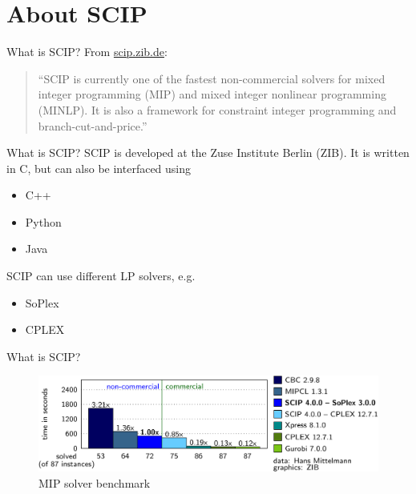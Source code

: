 \documentclass[fleqn]{beamer}
\begin{document}
	\section{About SCIP}
	\begin{frame}{What is SCIP?}
		From \url{scip.zib.de}:
		\begin{quote}
			``SCIP is currently one of the fastest non-commercial solvers for mixed integer programming (MIP)
			and mixed integer nonlinear programming (MINLP).
			It is also a framework for constraint integer programming and branch-cut-and-price.''
		\end{quote}
	\end{frame}

    \begin{frame}{What is SCIP?}
        SCIP is developed at the Zuse Institute Berlin (ZIB).
        It is written in C, but can also be interfaced using
        \begin{itemize}
            \item C++
            \item Python
            \item Java
        \end{itemize}
    
        SCIP can use different LP solvers, e.g.
        \begin{itemize}
            \item SoPlex %
            \item CPLEX
        \end{itemize}
    \end{frame}

    \begin{frame}{What is SCIP?}
        \begin{figure}
            \includegraphics{comparison}
            \caption{MIP solver benchmark}
        \end{figure}
    \end{frame}
\end{document}
